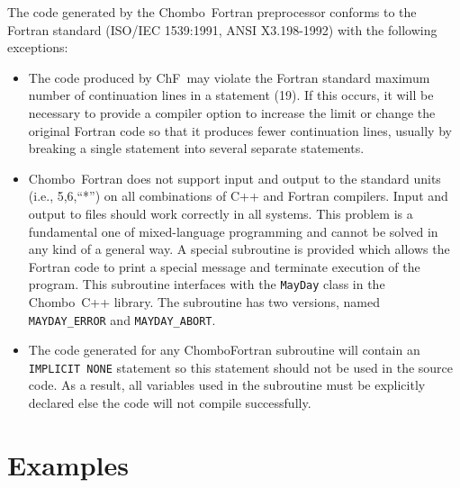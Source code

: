 \noindent The code generated by  the Chombo\ Fortran preprocessor conforms
to the Fortran standard (ISO/IEC 1539:1991, ANSI X3.198-1992) with the
following exceptions:
\begin{itemize}
\item The code produced by ChF\ may violate the Fortran standard maximum
number of continuation lines in a statement (19).  If this occurs, it will
be necessary to provide a compiler option to increase the limit or change the
original Fortran code so that it produces fewer continuation lines, usually 
by breaking a single statement into several separate statements.

\item 
Chombo\ Fortran does not support input and output to the standard units
(i.e., 5,6,``*'') on all combinations of C++ and Fortran compilers.  Input
and output to files should work correctly in all systems.  This
problem is a fundamental one of mixed-language programming and cannot
be solved in any kind of a general way.
A special subroutine is provided which allows the 
Fortran code to print a special
message and terminate execution of the program.  This subroutine interfaces
with the {\tt MayDay} class in the Chombo\ C++ library.  The subroutine
has two versions, named {\tt MAYDAY\_ERROR} and {\tt MAYDAY\_ABORT}.  

\item
The code generated for any ChomboFortran subroutine
will contain an {\tt IMPLICIT NONE} statement so this
statement should not be used in the source code.  As a result, all variables
used in the subroutine must be explicitly declared else the code will not
compile successfully.

\end{itemize}

\section{Examples}

